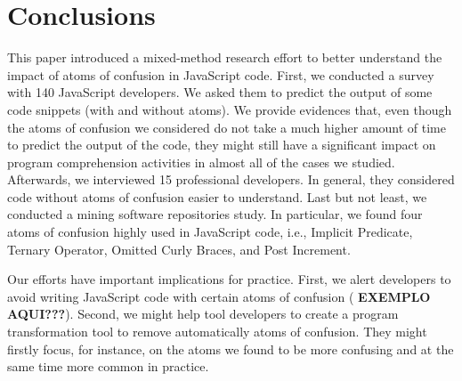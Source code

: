 \section{Conclusions}
\label{conclusion}

This paper introduced a mixed-method research effort to better understand the impact of atoms of confusion in JavaScript code. First, we conducted a survey with 140 JavaScript developers. We asked them to predict the output of some code snippets (with and without atoms). We provide evidences that, even though the atoms of confusion we considered do not take a much higher amount of time to predict the output of the code, they might still have a significant impact on program comprehension activities in almost all of the cases we studied. Afterwards, we interviewed 15 professional developers. In general, they considered code without atoms of confusion easier to understand. Last but not least, we conducted a mining software repositories study. In particular, we found four atoms of confusion highly used in JavaScript code, i.e., Implicit Predicate, Ternary Operator, Omitted Curly Braces, and Post Increment.

Our efforts have important implications for practice. First, we alert developers to avoid writing JavaScript code with certain atoms of confusion ({\color{red} \textbf{EXEMPLO AQUI???}).} Second, we might help tool developers to create a program transformation tool to remove automatically atoms of confusion. They might firstly focus, for instance, on the atoms we found to be more confusing and at the same time more common in practice.


